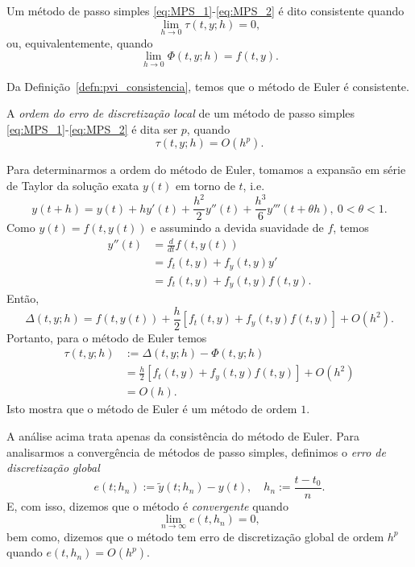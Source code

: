 \begin{defn}\label{defn:pvi_consistencia}
  Um método de passo simples \eqref{eq:MPS_1}-\eqref{eq:MPS_2} é dito consistente quando
  \begin{equation}
    \lim_{h\to 0}\tau(t,y;h) = 0,
  \end{equation}
ou, equivalentemente, quando
\begin{equation}
  \lim_{h\to 0} \Phi(t,y;h) = f(t,y).
\end{equation}
\end{defn}

\begin{obs}
  Da Definição~\ref{defn:pvi_consistencia}, temos que o método de Euler é consistente.
\end{obs}

A \emph{ordem do erro de discretização local} de um método de passo simples \eqref{eq:MPS_1}-\eqref{eq:MPS_2} é dita ser $p$, quando
\begin{equation}
  \tau(t,y;h) = O(h^p).
\end{equation}

Para determinarmos a ordem do método de Euler, tomamos a expansão em série de Taylor da solução exata $y(t)$ em torno de $t$, i.e.
\begin{equation}
  y(t+h) = y(t) + hy'(t) + \frac{h^2}{2}y''(t) + \frac{h^3}{6}y'''(t+\theta h), ~0<\theta<1.
\end{equation}
Como $y(t)=f(t,y(t))$ e assumindo a devida suavidade de $f$, temos
\begin{align}
  y''(t) &= \frac{d}{dt}f(t,y(t)) \\
         &= f_t(t,y) + f_y(t,y)y'\\
         &= f_t(t,y) + f_y(t,y)f(t,y).
\end{align}
Então,
\begin{equation}
  \Delta(t,y;h) = f(t,y(t)) + \frac{h}{2}[f_t(t,y) + f_y(t,y)f(t,y)] + O(h^2).
\end{equation}
Portanto, para o método de Euler temos
\begin{align}
  \tau(t,y;h) &:= \Delta(t,y;h)-\Phi(t,y;h)\\
              &= \frac{h}{2}[f_t(t,y) + f_y(t,y)f(t,y)] + O(h^2)\\
              &= O(h).
\end{align}
Isto mostra que o método de Euler é um método de ordem $1$.

A análise acima trata apenas da consistência do método de Euler. Para analisarmos a convergência de métodos de passo simples, definimos o \emph{erro de discretização global}
\begin{equation}
  e(t;h_n) := \tilde{y}(t;h_n) - y(t),\quad h_n := \frac{t-t_0}{n}.
\end{equation}
E, com isso, dizemos que o método é \emph{convergente} quando
\begin{equation}
  \lim_{n\to \infty} e(t,h_n) = 0,
\end{equation}
bem como, dizemos que o método tem erro de discretização global de ordem $h^p$ quando $e(t,h_n) = O(h^p)$.

